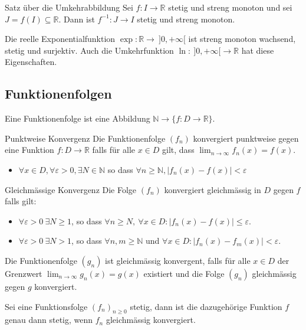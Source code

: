 \documentclass[a4paper,fontsize = 7pt]{scrartcl}
\def\limn{\lim_{n\to \infty}}
\def\R{\mathbb{R}}
\def\N{\mathbb{N}}
\begin{document}
\begin{mainbox}{Satz über die Umkehrabbildung}
  \vspace{-4pt}
 Sei $f: I \to \R$ stetig und streng monoton und sei $J = f(I) \subseteq \R$. Dann ist $f^{-1}: J \to I$ stetig und streng monoton.
 \vspace{-4pt}
\end{mainbox}

\begin{subbox}{Die reelle Exponentialfunktion}
  \vspace{-4pt}
  $\exp: \R \to \ ]0,+\infty[$ ist streng monoton wachsend, stetig und surjektiv. Auch die Umkehrfunktion $\ln: \ ]0,+\infty[ \to \R$ hat diese Eigenschaften.
  \vspace{-4pt}
\end{subbox}

\subsection{Funktionenfolgen}
Eine Funktionenfolge ist eine Abbildung $\N \to \{f: D \to \R \}$.
\begin{mainbox}{Punktweise Konvergenz}
  \vspace{-6pt}
  Die Funktionenfolge $(f_n)$ konvergiert punktweise gegen eine Funktion $f: D \to \R$ falls für alle $x \in D$ gilt, dass $\limn f_n(x) = f(x)$.
  \begin{itemize}
  \item $\forall x \in D, \forall \varepsilon>0, \exists N \in \N$ so dass $\forall n \geq \N, |f_n(x) -f(x)|<\varepsilon$
  \end{itemize}
  \vspace{-12pt}
\end{mainbox}

\begin{mainbox}{Gleichmässige Konvergenz}
  \vspace{-4pt}
 Die Folge $(f_n)$ konvergiert gleichmässig in $D$ gegen $f$ falls gilt:
 \begin{itemize}
  \item $\forall \varepsilon > 0 \ \exists N \ge 1$, so dass $\forall n \ge N, \ \forall x \in D: | f_n(x) - f(x) | \le \varepsilon$. 
  \item $\forall \varepsilon > 0 \ \exists N > 1$, so dass $\forall n, m \geq \N$ und $\forall x \in D: |f_n(x) - f_m(x)| < \varepsilon$.  
\end{itemize}
 Die Funktionenfolge $(g_n)$ ist gleichmässig konvergent, falls für alle $x\in D$ der Grenzwert $\limn g_n(x) = g(x)$ existiert und die Folge $(g_n)$ gleichmässig gegen $g$ konvergiert.
 \vspace{-4pt}
\end{mainbox}
Sei eine Funktionsfolge $(f_n)_{n \geq 0}$ stetig, dann ist die dazugehörige Funktion $f$ genau dann stetig, wenn $f_n$ gleichmässig konvergiert. 
\end{document}
